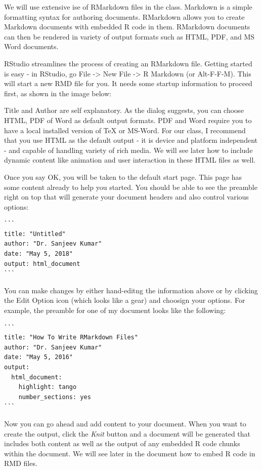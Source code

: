 \documentclass[10pt, letterpaper, twoside]{memoir}\usepackage{knitr}
\begin{document}
We will use extensive ise of RMarkdown files in the class. Markdown is a simple formatting syntax for authoring documents. RMarkdown allows you to create Markdown documents with embedded R code in them. RMarkdown documents can then be rendered in variety of output formats such as HTML, PDF, and MS Word documents. 

RStudio streamlines the process of creating an RMarkdown file. Getting started is easy - in RStudio, go File -> New File -> R Markdown (or Alt-F-F-M). This will start a new RMD file for you. It needs some startup information to proceed first, as shown in the image below:


Title and Author are self explanatory. As the dialog suggests, you can choose HTML, PDF of Word as default output formats. PDF and Word require you to have a local installed version of TeX or MS-Word. For our class, I recommend that you use HTML as the default output - it is device and platform independent - and capable of handling variety of rich media. We will see later how to include dynamic content like animation and user interaction in these HTML files as well.

Once you say OK, you will be taken to the default start page. This page has some content already to help you started. You should be able to see the preamble right on top that will generate your document headers and also control various options:

\begin{verbatim}
```
title: "Untitled"
author: "Dr. Sanjeev Kumar"
date: "May 5, 2018"
output: html_document
```
\end{verbatim}

You can make changes by either hand-editng the information above or by clicking the Edit Option icon (which looks like a gear) and choosign your options. For example, the preamble for one of my document looks like the following:

\begin{verbatim}
```
title: "How To Write RMarkdown Files"
author: "Dr. Sanjeev Kumar"
date: "May 5, 2016"
output:
  html_document: 
    highlight: tango
    number_sections: yes
```
\end{verbatim}

Now you can go ahead and add content to your document. When you want to create the output,  click the \emph{Knit} button and a document will be generated that includes both content as well as the output of any embedded R code chunks within the document. We will see later in the document how to embed R code in RMD files.
\end{document}
